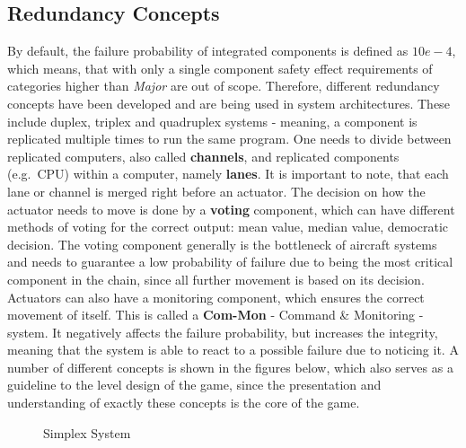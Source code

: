 \subsection{Redundancy Concepts}\label{subsec:redundancy-concepts}
By default, the failure probability of integrated components is defined as $10e-4$, which means, that with only a single component
safety effect requirements of categories higher than \textit{Major} are out of scope.
Therefore, different redundancy concepts have been developed and are being used in system architectures.
These include duplex, triplex and quadruplex systems - meaning, a component is replicated multiple times to run the same program.
One needs to divide between replicated computers, also called \textbf{channels}, and replicated components (e.g.\ CPU) within a computer,
namely \textbf{lanes}.
It is important to note, that each lane or channel is merged right before an actuator.
The decision on how the actuator needs to move is done by a \textbf{voting} component, which can have different methods of voting
for the correct output: mean value, median value, democratic decision.
The voting component generally is the bottleneck of aircraft systems and needs to guarantee a low probability of failure
due to being the most critical component in the chain, since all further movement is based on its decision.
Actuators can also have a monitoring component, which ensures the correct movement of itself.
This is called a \textbf{Com-Mon} - Command \& Monitoring - system.
It negatively affects the failure probability, but increases the integrity, meaning that the system is able to react to a possible failure due
to noticing it.
A number of different concepts is shown in the figures below, which also serves as a guideline to the level design of the game,
since the presentation and understanding of exactly these concepts is the core of the game.
\\
\begin{figure}
    \begin{center}
    \end{center}
    \caption{Simplex System}
    \label{fig:simplex-example}
\end{figure}
